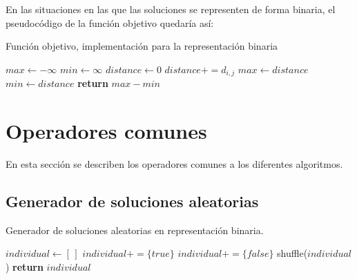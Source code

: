 En las situaciones en las que las soluciones se representen de forma binaria, el pseudocódigo de la función objetivo quedaría así:
\begin{algorithm}[H]
    \caption{Función objetivo, implementación para la representación binaria}
\begin{algorithmic}
\State $max \gets -\infty$
\State $min \gets \infty$
 
        \State $distance \gets 0$
        \State
             
                \State $distance += d_{i,j}$
            \EndIf
        \EndFor
        \State
            \State $max \gets distance$
        \EndIf
            \State $min \gets distance$
        \EndIf
    \EndIf
\EndFor
\State \textbf{return} $max - min$
\end{algorithmic}
\end{algorithm}

\section{Operadores comunes}

En esta sección se describen los operadores comunes a los diferentes algoritmos.

\subsection{Generador de soluciones aleatorias}
\begin{algorithm}[H]
    \caption{Generador de soluciones aleatorias en representación binaria.}
\begin{algorithmic}
    \State $individual \leftarrow [ \, ]$
        \State $individual += \{true\}$ 
    \EndFor
        \State $individual += \{false\}$
    \EndFor
    \State shuffle($individual$)
    \State \textbf{return} $individual$
\EndProcedure
\end{algorithmic}
\end{algorithm}


